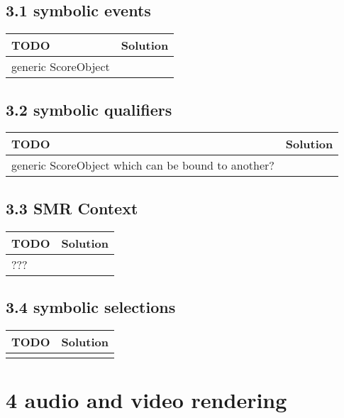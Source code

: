  \subsection*{3.1 symbolic events}
 \begin{tabular}{|p{}|p{}|}
 \hline
 \textbf{TODO} &
 \textbf{Solution} 
\\
 \hline
	generic ScoreObject &
  
\\ 	\hline
 \end{tabular} \subsection*{3.2 symbolic qualifiers}
 \begin{tabular}{|p{}|p{}|}
 \hline
 \textbf{TODO} &
 \textbf{Solution} 
\\
 \hline
	generic ScoreObject which can be bound to another? &
  
\\ 	\hline
 \end{tabular} \subsection*{3.3 SMR Context}
 \begin{tabular}{|p{}|p{}|}
 \hline
 \textbf{TODO} &
 \textbf{Solution} 
\\
 \hline
	??? &
  
\\ 	\hline
 \end{tabular} \subsection*{3.4 symbolic selections}
 \begin{tabular}{|p{}|p{}|}
 \hline
 \textbf{TODO} &
 \textbf{Solution} 
\\
 \hline
 &
  
\\ 	\hline
 \end{tabular} \section*{4 audio and video rendering}
